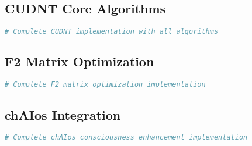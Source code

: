 \documentclass[11pt,a4paper]{article}
\begin{document}
\subsection{CUDNT Core Algorithms}

\begin{lstlisting}[language=Python, caption=CUDNT Core Implementation]
# Complete CUDNT implementation with all algorithms
\end{lstlisting}

\subsection{F2 Matrix Optimization}

\begin{lstlisting}[language=Python, caption=F2 Matrix Optimization Complete Code]
# Complete F2 matrix optimization implementation
\end{lstlisting}

\subsection{chAIos Integration}

\begin{lstlisting}[language=Python, caption=chAIos Complete Implementation]
# Complete chAIos consciousness enhancement implementation
\end{lstlisting}
\end{document}
